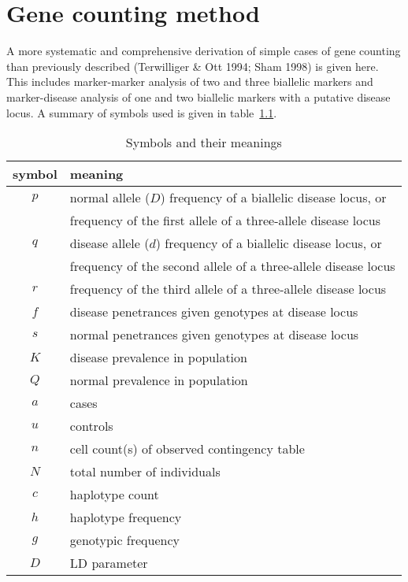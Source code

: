 
\chapter{Gene counting method}\label{genecount}

A more systematic and comprehensive derivation of simple cases of gene counting
than previously described (Terwilliger \& Ott 1994; Sham 1998) is given here.
This includes marker-marker analysis of two and three biallelic markers and
marker-disease analysis of one and two biallelic markers with a putative
disease locus.  A summary of symbols used is given in table~\ref{symbol}.

\begin{table}[h]
\centering
\caption{Symbols and their meanings\label{symbol}}
\vskip 0.3cm
\begin{tabular}{c|l}
\hline
symbol & meaning \\
\hline
$p$   & normal allele ($D$) frequency of a biallelic disease locus, or\\
      & frequency of the first allele of a three-allele disease locus \\
$q$   & disease allele ($d$) frequency of a biallelic disease locus, or\\
      & frequency of the second allele of a three-allele disease locus \\
$r$   & frequency of the third allele of a three-allele disease locus\\
$f$   & disease penetrances given genotypes at disease locus\\
$s$   & normal penetrances given genotypes at disease locus\\
$K$   & disease prevalence in population\\
$Q$   & normal prevalence in population\\
$a$   & cases\\
$u$   & controls\\
$n$   & cell count(s) of observed contingency table\\
$N$   & total number of individuals\\
$c$   & haplotype count\\
$h$   & haplotype frequency\\
$g$   & genotypic frequency\\
$D$   & LD parameter\\
\hline
\end{tabular}
\end{table}


